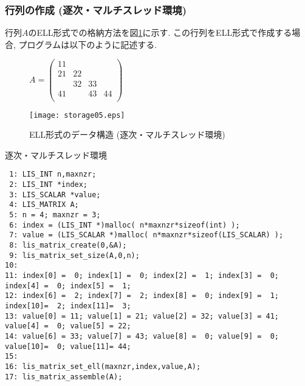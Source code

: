 \documentclass[a4paper]{jarticle}
\begin{document}
{{\subsubsection{行列の作成 (逐次・マルチスレッド環境)}
行列$A$のELL形式での格納方法を図\ref{fig:storage05}に示す. 
この行列をELL形式で作成する場合, プログラムは以下のように記述する. 
\begin{figure}[h]
{\centering 
\begin{minipage}{0.3\textwidth}
\begin{flushright}
$ 
A = \left(
\begin{array}{cccc}
11 &    &    &    \\
21 & 22 &    &    \\
   & 32 & 33 &    \\
41 &    & 43 & 44 \\
\end{array}\right)
$
\end{flushright}
\end{minipage}
\begin{minipage}{0.6\textwidth}
\begin{flushleft}
\texttt{[image: storage05.eps]} 
\end{flushleft}
\end{minipage}
\caption{ELL形式のデータ構造 (逐次・マルチスレッド環境)}\label{fig:storage05}}
\end{figure}
\begin{itembox}[l]{逐次・マルチスレッド環境}
\small
\begin{verbatim}
 1: LIS_INT n,maxnzr;
 2: LIS_INT *index;
 3: LIS_SCALAR *value;
 4: LIS_MATRIX A;
 5: n = 4; maxnzr = 3;
 6: index = (LIS_INT *)malloc( n*maxnzr*sizeof(int) );
 7: value = (LIS_SCALAR *)malloc( n*maxnzr*sizeof(LIS_SCALAR) );
 8: lis_matrix_create(0,&A);
 9: lis_matrix_set_size(A,0,n);
10:
11: index[0] =  0; index[1] =  0; index[2] =  1; index[3] =  0; index[4] =  0; index[5] =  1;
12: index[6] =  2; index[7] =  2; index[8] =  0; index[9] =  1; index[10]=  2; index[11]=  3;
13: value[0] = 11; value[1] = 21; value[2] = 32; value[3] = 41; value[4] =  0; value[5] = 22;
14: value[6] = 33; value[7] = 43; value[8] =  0; value[9] =  0; value[10]=  0; value[11]= 44;
15:
16: lis_matrix_set_ell(maxnzr,index,value,A);
17: lis_matrix_assemble(A);
\end{verbatim}
\end{itembox}

\newpage
}}
\end{document}
